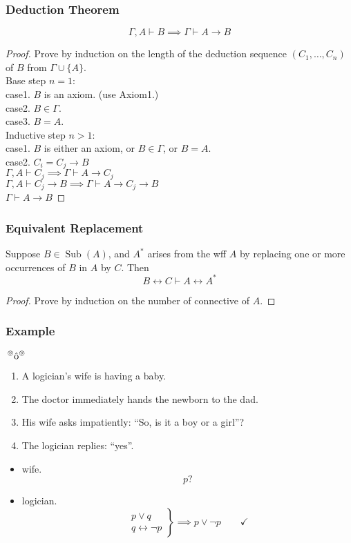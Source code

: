 \documentclass[UTF8,11pt,colorlinks,compress,openany]{beamer}%
\begin{document}
\begin{frame}\frametitle{Deduction Theorem}
	\begin{theorem}
		\[\Gamma, A\vdash B\implies\Gamma\vdash A\to B\]
	\end{theorem}
	\begin{proof}Prove by induction on the length of the deduction sequence $(C_1,\dots,C_n)$ of $B$ from $\Gamma\cup\{A\}$.\\
		Base step $n=1$:\\
		case1. $B$ is an axiom. (use Axiom1.)\\
		case2. $B\in\Gamma$.\\
		case3. $B=A$.\\
		Inductive step $n>1$:\\
		case1. $B$ is either an axiom, or $B\in\Gamma$, or $B=A$.\\
		case2. $C_i=C_j\to B$\\
		$\Gamma, A\vdash C_j\implies\Gamma\vdash A\to C_j$\\
		$\Gamma, A\vdash C_j\to B\implies\Gamma\vdash A\to C_j\to B$\\
		$\Gamma\vdash A\to B$
	\end{proof}
\end{frame}

\begin{frame}\frametitle{Equivalent Replacement}
	\begin{theorem}
		Suppose $B\in \operatorname{Sub}(A)$, and $A^*$ arises from the wff $A$ by replacing one or more occurrences of $B$ in $A$ by $C$. Then
		\[B\leftrightarrow C\vdash A\leftrightarrow A^*\]
	\end{theorem}
	\begin{proof}
		Prove by induction on the number of connective of $A$.
	\end{proof}
\end{frame}

\begin{frame}\frametitle{Example}
	\begin{block}{$\sideset{^\circledcirc}{^\circledcirc}{\operatorname{\hat{o}}}$}
		\begin{enumerate}
			\item A logician's wife is having a baby. 
			\item The doctor immediately hands the newborn to the dad.
			\item His wife asks impatiently: ``So, is it a boy or a girl''?
			\item The logician replies: ``yes''.
		\end{enumerate}
	\end{block}
	\begin{itemize}
	\item wife.
	\[p?\]
	\item logician.
	\[\left.\begin{array}{r} p\vee q\\q\leftrightarrow\neg p\end{array}\right\}\implies p\vee\neg p\qquad\checkmark\]
	\end{itemize}
\end{frame}
\end{document}
